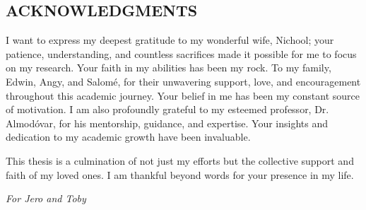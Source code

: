 



\vspace*{0.5in}
\begin{center}
\section*{ACKNOWLEDGMENTS}
\end{center}


\noindent
I want to express my deepest gratitude to my wonderful wife, Nichool; your patience, understanding, and countless sacrifices made it possible for me to focus on my research. Your faith in my abilities has been my rock. To my family, Edwin, Angy, and Salomé, for their unwavering support, love, and encouragement throughout this academic journey. Your belief in me has been my constant source of motivation. I am also profoundly grateful to my esteemed professor, Dr. Almodóvar, for his mentorship, guidance, and expertise. Your insights and dedication to my academic growth have been invaluable.

This thesis is a culmination of not just my efforts but the collective support and faith of my loved ones. I am thankful beyond words for your presence in my life. 


\newpage



\vspace*{2in}
\begin{center}
\emph{For Jero and Toby} %
\end{center}
